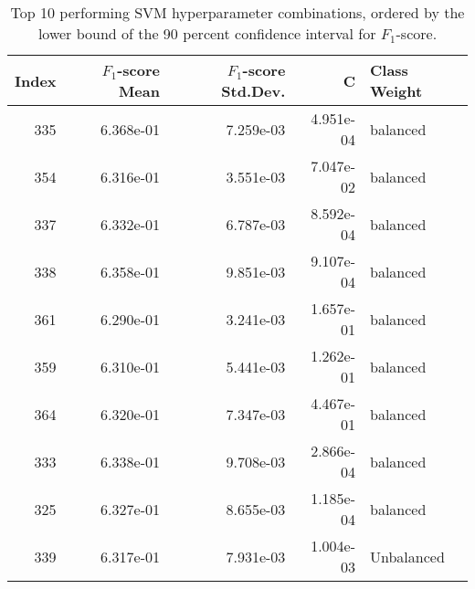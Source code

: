 \begin{table}
\caption{Top 10 performing SVM hyperparameter combinations, ordered by the lower bound of the 90 percent confidence interval for $F_1$-score.}
\label{tab:05_best_svm_hpars}
\begin{tabular}{rrrrl}
\toprule
Index & $F_1$-score Mean & $F_1$-score Std.Dev. & C & Class Weight \\
\midrule
335 & 6.368e-01 & 7.259e-03 & 4.951e-04 & balanced \\
354 & 6.316e-01 & 3.551e-03 & 7.047e-02 & balanced \\
337 & 6.332e-01 & 6.787e-03 & 8.592e-04 & balanced \\
338 & 6.358e-01 & 9.851e-03 & 9.107e-04 & balanced \\
361 & 6.290e-01 & 3.241e-03 & 1.657e-01 & balanced \\
359 & 6.310e-01 & 5.441e-03 & 1.262e-01 & balanced \\
364 & 6.320e-01 & 7.347e-03 & 4.467e-01 & balanced \\
333 & 6.338e-01 & 9.708e-03 & 2.866e-04 & balanced \\
325 & 6.327e-01 & 8.655e-03 & 1.185e-04 & balanced \\
339 & 6.317e-01 & 7.931e-03 & 1.004e-03 & Unbalanced \\
\bottomrule
\end{tabular}
\end{table}
